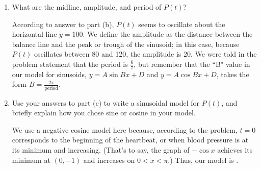 \documentclass{article}
\begin{document}
\begin{enumerate}
\begin{enumerate}
\begin{solution}
    \begin{center}
    \end{center}
\end{solution}
\vfill\vfill\item What are the midline, amplitude, and period of $P(t)$?
\begin{solution}
According to answer to part (b), $P(t)$ seems to oscillate about the horizontal line $y=100$. We define the amplitude as the distance between the balance line and the peak or trough of the sinusoid; in this case, because $P(t)$ oscillates between 80 and 120, the amplitude is 20. We were told in the problem statement that the period is $\frac{6}{7}$, but remember that the ``B" value in our model for sinusoids, $y=A\sin{Bx}+D$ and $y=A\cos{Bx}+D$, takes the form $B=\frac{2\pi}{\text{period}}$.
\end{solution}
\vfill
\item Use your answers to part (c) to write a sinusoidal model for $P(t)$, and briefly explain how you chose sine or cosine in your model. 

\begin{solution}
We use a negative cosine model here because, according to the problem, $t=0$ corresponds to the beginning of the heartbeat, or when blood pressure is at its minimum and increasing. (That's to say, the graph of $-\cos{x}$ achieves its minimum at $(0,-1)$ and increases on $0<x<\pi$.) Thus, our model is .    
\end{solution}
\vfill
\end{enumerate}
\newpage

\end{enumerate}
\end{document}
